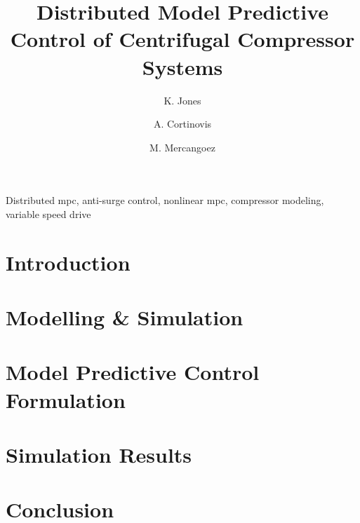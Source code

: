 \documentclass{ifacconf}
\begin{document}
\begin{frontmatter}

\title{Distributed Model Predictive Control of Centrifugal Compressor Systems} 


\author[First]{K. Jones} 
\author[First]{A. Cortinovis} 
\author[First]{M. Mercangoez}

\address[First]{ABB Switzerland Ltd., Corporate Research, Baden-Dättwil, Switzerland (e-mail: katie.jones@reactive-robotics.com, andrea.cortinovis@ch.abb.com, mehmet.mercangoez@ch.abb.com).}

\begin{abstract}                %
  
\end{abstract}

\begin{keyword}
  Distributed mpc, anti-surge control, nonlinear mpc, compressor modeling, variable speed drive
\end{keyword}

\end{frontmatter}

\section{Introduction}


\section{Modelling \& Simulation}


\section{Model Predictive Control Formulation}


\section{Simulation Results}


\section{Conclusion}



\end{document}
